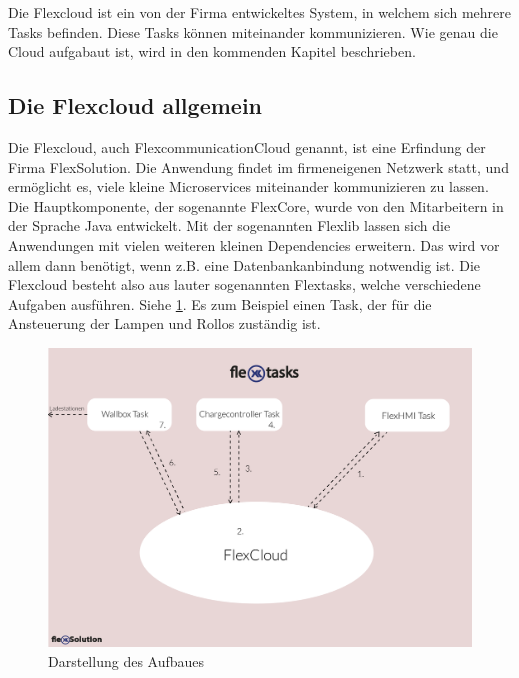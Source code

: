 Die Flexcloud ist ein von der Firma entwickeltes System, in welchem sich mehrere Tasks befinden. Diese Tasks können miteinander kommunizieren. Wie genau die Cloud aufgabaut ist, wird in den kommenden Kapitel beschrieben.

\subsection{Die Flexcloud allgemein} 





Die Flexcloud, auch FlexcommunicationCloud genannt, ist eine Erfindung der Firma FlexSolution. Die Anwendung findet im firmeneigenen Netzwerk statt, und ermöglicht es, viele kleine Microservices miteinander kommunizieren zu lassen. Die Hauptkomponente, der sogenannte FlexCore, wurde von den Mitarbeitern in der Sprache Java entwickelt. Mit der sogenannten Flexlib lassen sich die Anwendungen mit vielen weiteren kleinen Dependencies erweitern. Das wird vor allem dann benötigt, wenn z.B. eine Datenbankanbindung notwendig ist. Die Flexcloud besteht also aus lauter sogenannten Flextasks, welche verschiedene Aufgaben ausführen. Siehe \ref{fig:impl:FlexcloudAnsicht}. Es zum Beispiel einen Task, der für die Ansteuerung der Lampen und Rollos zuständig ist.

\begin{figure}[h t]
    \centering
    \includegraphics[scale=0.7]{pics/flexTasks2.png}
    \caption{Darstellung des Aufbaues}
    \label{fig:impl:FlexcloudAnsicht}
\end{figure}




